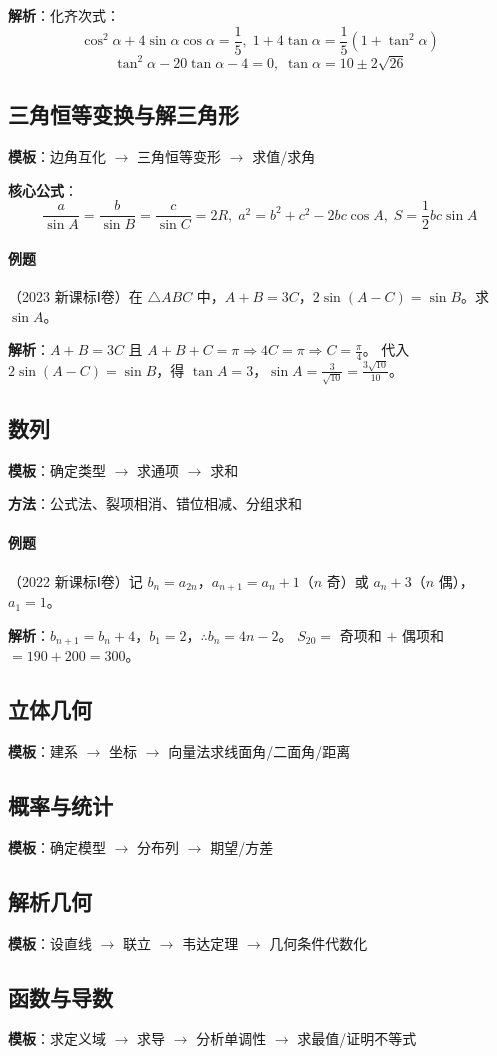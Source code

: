 \textbf{解析}：化齐次式：
\[
\cos^2\alpha + 4\sin\alpha\cos\alpha = \frac15,\;
1 + 4\tan\alpha = \frac15(1+\tan^2\alpha)
\]
\[
\tan^2\alpha - 20\tan\alpha - 4 = 0,\;
\tan\alpha = 10 \pm 2\sqrt{26}
\]

\subsection{三角恒等变换与解三角形}

\textbf{模板}：边角互化 $\to$ 三角恒等变形 $\to$ 求值/求角

\textbf{核心公式}：
\[
\frac{a}{\sin A} = \frac{b}{\sin B} = \frac{c}{\sin C} = 2R,\;
a^2 = b^2 + c^2 - 2bc\cos A,\;
S = \frac12 bc\sin A
\]

\paragraph{例题}（2023 新课标Ⅰ卷）在 $\triangle ABC$ 中，$A+B=3C$，$2\sin(A-C)=\sin B$。求 $\sin A$。

\textbf{解析}：$A+B=3C$ 且 $A+B+C=\pi \Rightarrow 4C=\pi \Rightarrow C=\frac{\pi}{4}$。
代入 $2\sin(A-C)=\sin B$，得 $\tan A=3$，$\sin A=\frac{3}{\sqrt{10}}=\frac{3\sqrt{10}}{10}$。

\subsection{数列}

\textbf{模板}：确定类型 $\to$ 求通项 $\to$ 求和

\textbf{方法}：公式法、裂项相消、错位相减、分组求和

\paragraph{例题}（2022 新课标Ⅰ卷）记 $b_n = a_{2n}$，$a_{n+1}=a_n+1$（$n$ 奇）或 $a_n+3$（$n$ 偶），$a_1=1$。

\textbf{解析}：$b_{n+1}=b_n+4$，$b_1=2$，$\therefore b_n=4n-2$。
$S_{20}=$ 奇项和 $+$ 偶项和 $=190+200=300$。

\subsection{立体几何}

\textbf{模板}：建系 $\to$ 坐标 $\to$ 向量法求线面角/二面角/距离

\subsection{概率与统计}

\textbf{模板}：确定模型 $\to$ 分布列 $\to$ 期望/方差

\subsection{解析几何}

\textbf{模板}：设直线 $\to$ 联立 $\to$ 韦达定理 $\to$ 几何条件代数化

\subsection{函数与导数}

\textbf{模板}：求定义域 $\to$ 求导 $\to$ 分析单调性 $\to$ 求最值/证明不等式
